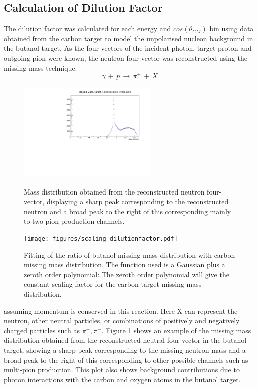 \subsection{Calculation of Dilution Factor}
\label{ch:dil_factor}
The dilution factor was calculated for each energy and $cos(\theta_{CM})$ bin using data obtained from the carbon target to model the unpolarised nucleon background in the butanol target.
As the four vectors of the incident photon, target proton and outgoing pion were known, the neutron four-vector was reconstructed using the missing mass technique:
$$
\gamma \, + \,  p \, \rightarrow \, \pi^+ \, + \, X
$$
\begin{figure}[htb]
  \begin{center}
    \includegraphics[width=0.6\textwidth]{figures/neutron_missingmass.pdf} \\
    \caption{Mass distribution obtained from the reconstructed neutron four-vector, displaying a sharp peak corresponding to the reconstructed neutron and
a broad peak to the right of this corresponding mainly to two-pion production channels. }
    \label{fig:frost_neutronmissing_ex}
  \end{center}
\end{figure}
\begin{figure}[htb]
  \begin{center}
    \texttt{[image: figures/scaling\_dilutionfactor.pdf]} \\
    \caption{Fitting of the ratio of butanol missing mass distribution with carbon missing mass distribution. The function used is a Gaussian plus a zeroth order polynomial: The zeroth order polynomial will give the constant scaling factor for the carbon target missing mass distribution. }
    \label{fig:scaling_dilutionfactor}
  \end{center}
\end{figure}
assuming momentum is conserved in this reaction. Here X can represent the neutron, other neutral particles, or combinations of positively and negatively charged particles such as $\pi^+ , \pi^-$. Figure \ref{fig:frost_neutronmissing_ex} shows an example of the missing mass distribution obtained from the reconstructed neutral four-vector in the butanol target, showing a sharp peak corresponding to the missing neutron mass and a broad peak to the right of this corresponding to other possible channels such as multi-pion production. This plot also shows background contributions due to photon interactions with the carbon and oxygen atoms in the butanol target.

